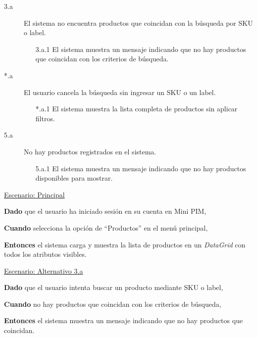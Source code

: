 \begin{description}
    \item[3.a] El sistema no encuentra productos que coincidan con la búsqueda por SKU o label.
    \begin{enumerate}
        \item[3.a.1] El sistema muestra un mensaje indicando que no hay productos que coincidan con los criterios de búsqueda.
    \end{enumerate}

    \item[*.a] El usuario cancela la búsqueda sin ingresar un SKU o un label.
    \begin{enumerate}
        \item[*.a.1] El sistema muestra la lista completa de productos sin aplicar filtros.
    \end{enumerate}

    \item[5.a] No hay productos registrados en el sistema.
    \begin{enumerate}
        \item[5.a.1] El sistema muestra un mensaje indicando que no hay productos disponibles para mostrar.
    \end{enumerate}
\end{description}

\underline{Escenario: Principal}\par
\vspace{0.15cm}
\textbf{Dado} que el usuario ha iniciado sesión en su cuenta en Mini PIM,\par
\textbf{Cuando} selecciona la opción de \enquote{Productos} en el menú principal,\par
\textbf{Entonces} el sistema carga y muestra la lista de productos en un \textit{DataGrid} con todos los atributos visibles.\par
\vspace{0.20cm}

\underline{Escenario: Alternativo 3.a}\par
\vspace{0.15cm}
\textbf{Dado} que el usuario intenta buscar un producto mediante SKU o label,\par
\textbf{Cuando} no hay productos que coincidan con los criterios de búsqueda,\par
\textbf{Entonces} el sistema muestra un mensaje indicando que no hay productos que coincidan.\par
\vspace{0.20cm}

